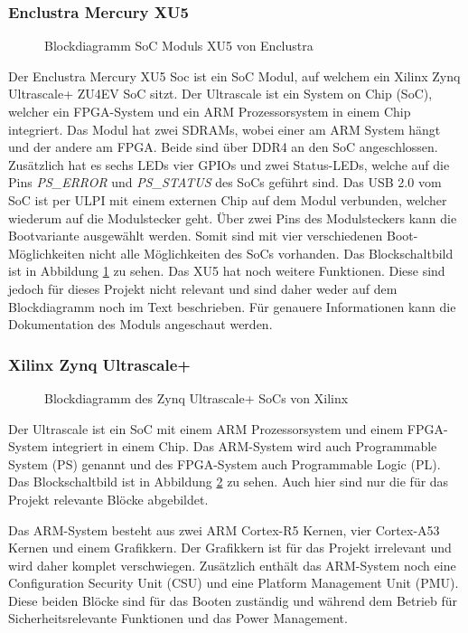 \documentclass{article}
\begin{document}
\subsubsection*{Enclustra Mercury XU5}
\begin{figure}[tb]
    \caption{Blockdiagramm SoC Moduls XU5 von Enclustra}
    \label{fig:bd_xu5}
\end{figure}
Der Enclustra Mercury XU5 Soc ist ein SoC Modul, auf welchem ein Xilinx Zynq Ultrascale+ ZU4EV SoC sitzt. 
Der Ultrascale ist ein System on Chip (SoC), welcher ein FPGA-System und ein ARM Prozessorsystem in einem Chip integriert. 
Das Modul hat zwei SDRAMs, wobei einer am ARM System hängt und der andere am FPGA. Beide sind über DDR4 an den SoC angeschlossen. 
Zusätzlich hat es sechs LEDs vier GPIOs und zwei Status-LEDs, welche auf die Pins \textit{PS\_ERROR} und \textit{PS\_STATUS} des SoCs geführt sind. 
Das USB 2.0 vom SoC ist per ULPI mit einem externen Chip auf dem Modul verbunden, welcher wiederum auf die Modulstecker geht. Über zwei Pins des Modulsteckers kann die Bootvariante ausgewählt werden. Somit sind mit vier verschiedenen Boot-Möglichkeiten nicht alle Möglichkeiten des SoCs vorhanden.
Das Blockschaltbild ist in Abbildung \ref{fig:bd_xu5} zu sehen. Das XU5 hat noch weitere Funktionen. 
Diese sind jedoch für dieses Projekt nicht relevant und sind daher weder auf dem Blockdiagramm noch im Text beschrieben. 
Für genauere Informationen kann die Dokumentation des Moduls angeschaut werden. 

\subsubsection*{Xilinx Zynq Ultrascale+}
\begin{figure}[tb]
    \caption{Blockdiagramm des Zynq Ultrascale+ SoCs von Xilinx}
    \label{fig:bd_soc}
\end{figure}

Der Ultrascale ist ein SoC mit einem ARM Prozessorsystem und einem FPGA-System integriert in einem Chip. Das ARM-System wird auch Programmable System (PS) genannt und des FPGA-System auch Programmable Logic (PL). Das Blockschaltbild ist in Abbildung \ref{fig:bd_soc} zu sehen. Auch hier sind nur die für das Projekt relevante Blöcke abgebildet. 

Das ARM-System besteht aus zwei ARM Cortex-R5 Kernen, vier Cortex-A53 Kernen und einem Grafikkern. Der Grafikkern ist für das Projekt irrelevant und wird daher komplet verschwiegen. Zusätzlich enthält das ARM-System noch eine Configuration Security Unit (CSU) und eine Platform Management Unit (PMU). Diese beiden Blöcke sind für das Booten zuständig und während dem Betrieb für Sicherheitsrelevante Funktionen und das Power Management.
\end{document}
